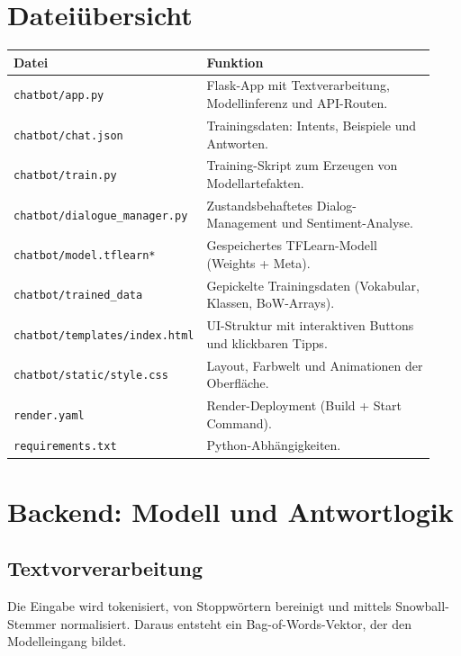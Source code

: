 \documentclass[a4paper,11pt]{article}
\begin{document}
\section{Datei\"ubersicht}
\begin{longtable}{p{0.38\linewidth} p{0.55\linewidth}}
\toprule
\textbf{Datei} & \textbf{Funktion} \\
\midrule
\texttt{chatbot/app.py} & Flask-App mit Textverarbeitung, Modellinferenz und API-Routen. \\
\texttt{chatbot/chat.json} & Trainingsdaten: Intents, Beispiele und Antworten. \\
\texttt{chatbot/train.py} & Training-Skript zum Erzeugen von Modellartefakten. \\
\texttt{chatbot/dialogue\_manager.py} & Zustandsbehaftetes Dialog-Management und Sentiment-Analyse. \\
\texttt{chatbot/model.tflearn*} & Gespeichertes TFLearn-Modell (Weights + Meta). \\
\texttt{chatbot/trained\_data} & Gepickelte Trainingsdaten (Vokabular, Klassen, BoW-Arrays). \\
\texttt{chatbot/templates/index.html} & UI-Struktur mit interaktiven Buttons und klickbaren Tipps. \\
\texttt{chatbot/static/style.css} & Layout, Farbwelt und Animationen der Oberfl\"ache. \\
\texttt{render.yaml} & Render-Deployment (Build + Start Command). \\
\texttt{requirements.txt} & Python-Abh\"angigkeiten. \\
\bottomrule
\end{longtable}

\section{Backend: Modell und Antwortlogik}
\subsection{Textvorverarbeitung}
Die Eingabe wird tokenisiert, von Stoppw\"ortern bereinigt und mittels Snowball-Stemmer normalisiert. Daraus entsteht ein Bag-of-Words-Vektor, der den Modelleingang bildet.
\end{document}
